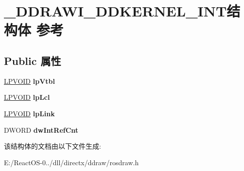 \hypertarget{struct___d_d_r_a_w_i___d_d_k_e_r_n_e_l___i_n_t}{}\section{\+\_\+\+D\+D\+R\+A\+W\+I\+\_\+\+D\+D\+K\+E\+R\+N\+E\+L\+\_\+\+I\+N\+T结构体 参考}
\label{struct___d_d_r_a_w_i___d_d_k_e_r_n_e_l___i_n_t}
\subsection*{Public 属性}
\begin{DoxyCompactItemize}
\item 
\mbox{\label{struct___d_d_r_a_w_i___d_d_k_e_r_n_e_l___i_n_t_a5d22bb3a1f8885438169b70814b77d80}} 
\hyperlink{interfacevoid}{L\+P\+V\+O\+ID} {\bfseries lp\+Vtbl}
\item 
\mbox{\label{struct___d_d_r_a_w_i___d_d_k_e_r_n_e_l___i_n_t_afe2117146f0e9ae6b8df8dbb56cc4baa}} 
\hyperlink{interfacevoid}{L\+P\+V\+O\+ID} {\bfseries lp\+Lcl}
\item 
\mbox{\label{struct___d_d_r_a_w_i___d_d_k_e_r_n_e_l___i_n_t_a4326ee6e4a13445e2990d01e2ecd02c3}} 
\hyperlink{interfacevoid}{L\+P\+V\+O\+ID} {\bfseries lp\+Link}
\item 
\mbox{\label{struct___d_d_r_a_w_i___d_d_k_e_r_n_e_l___i_n_t_aced1da3a23c5923fa7b2cd91d5d3f0c6}} 
D\+W\+O\+RD {\bfseries dw\+Int\+Ref\+Cnt}
\end{DoxyCompactItemize}


该结构体的文档由以下文件生成\+:\begin{DoxyCompactItemize}
\item 
E\+:/\+React\+O\+S-\/0../dll/directx/ddraw/rosdraw.\+h\end{DoxyCompactItemize}
